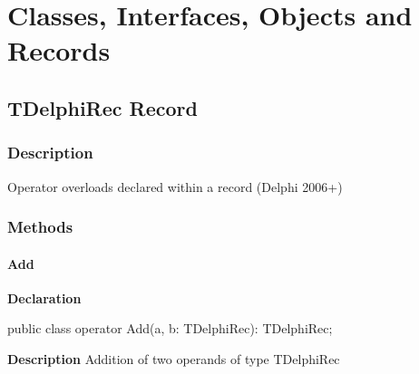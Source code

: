 \documentclass{report}
\newif\ifpdf
\begin{document}
\section{Classes, Interfaces, Objects and Records}
\ifpdf
\subsection*{\large{\textbf{TDelphiRec Record}}\normalsize\hspace{1ex}\hrulefill}
\else
\subsection*{TDelphiRec Record}
\fi
\label{ok_operator_test.TDelphiRec}
\subsubsection*{\large{\textbf{Description}}\normalsize\hspace{1ex}\hfill}
Operator overloads declared within a record (Delphi 2006+)\subsubsection*{\large{\textbf{Methods}}\normalsize\hspace{1ex}\hfill}
\paragraph*{Add}\hspace*{\fill}

\label{ok_operator_test.TDelphiRec-Add}
\begin{list}{}{
\setlength{\itemindent}{0cm}
\setlength{\listparindent}{0cm}
\setlength{\leftmargin}{\evensidemargin}
\addtolength{\leftmargin}{\tmplength}
\settowidth{\labelsep}{X}
\addtolength{\leftmargin}{\labelsep}
\setlength{\labelwidth}{\tmplength}
}
\item[\textbf{Declaration}\hfill]
\ifpdf
\begin{flushleft}
\fi
\begin{ttfamily}
public class operator Add(a, b: TDelphiRec): TDelphiRec;\end{ttfamily}

\ifpdf
\end{flushleft}
\fi

\par
\item[\textbf{Description}]
Addition of two operands of type TDelphiRec

\end{list}
\end{document}
